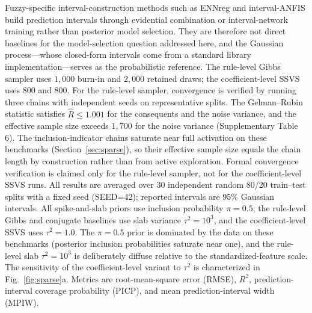 \documentclass[review,1p,times]{elsarticle}
\begin{document}
Fuzzy-specific interval-construction methods such as ENNreg \cite{denoeux2023ennreg} and interval-ANFIS \cite{miskony2018predictionintervals} build prediction intervals through evidential combination or interval-network training rather than posterior model selection.
They are therefore not direct baselines for the model-selection question addressed here, and the Gaussian process---whose closed-form intervals come from a standard library implementation---serves as the probabilistic reference. The rule-level Gibbs sampler uses $1{,}000$ burn-in and $2{,}000$ retained draws; the coefficient-level SSVS uses $800$ and $800$.
For the rule-level sampler, convergence is verified by running three chains with independent seeds on representative splits.
The Gelman--Rubin statistic satisfies $\hat{R}\le1.001$ for the consequents and the noise variance, and the effective sample size exceeds $1{,}700$ for the noise variance (Supplementary Table 6).
The inclusion-indicator chains saturate near full activation on these benchmarks (Section~\ref{sec:sparse}), so their effective sample size equals the chain length by construction rather than from active exploration.
Formal convergence verification is claimed only for the rule-level sampler, not for the coefficient-level SSVS runs. All results are averaged over 30 independent random 80/20 train--test splits with a fixed seed (SEED=42); reported intervals are 95\% Gaussian intervals. All spike-and-slab priors use inclusion probability $\pi=0.5$; the rule-level Gibbs and conjugate baselines use slab variance $\tau^2=10^3$, and the coefficient-level SSVS uses $\tau^2=1.0$.
The $\pi=0.5$ prior is dominated by the data on these benchmarks (posterior inclusion probabilities saturate near one), and the rule-level slab $\tau^2=10^3$ is deliberately diffuse relative to the standardized-feature scale.
The sensitivity of the coefficient-level variant to $\tau^2$ is characterized in Fig.~\ref{fig:sparse}a. Metrics are root-mean-square error (RMSE), $R^2$, prediction-interval coverage probability (PICP), and mean prediction-interval width (MPIW).
\end{document}

